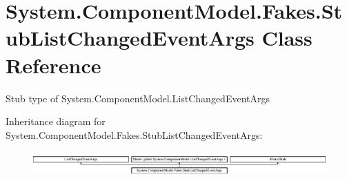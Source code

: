 \hypertarget{class_system_1_1_component_model_1_1_fakes_1_1_stub_list_changed_event_args}{\section{System.\-Component\-Model.\-Fakes.\-Stub\-List\-Changed\-Event\-Args Class Reference}
\label{class_system_1_1_component_model_1_1_fakes_1_1_stub_list_changed_event_args}
}


Stub type of System.\-Component\-Model.\-List\-Changed\-Event\-Args 


Inheritance diagram for System.\-Component\-Model.\-Fakes.\-Stub\-List\-Changed\-Event\-Args\-:\begin{figure}[H]
\begin{center}
\leavevmode
\includegraphics[height=0.969697cm]{class_system_1_1_component_model_1_1_fakes_1_1_stub_list_changed_event_args}
\end{center}
\end{figure}
